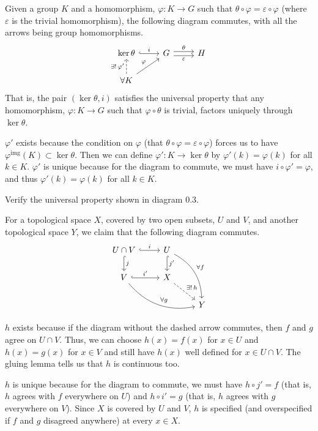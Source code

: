 \documentclass[letterpaper, 12pt]{hmcpset}
\begin{document}
\begin{solution}
	Given a group $K$ and a homomorphism, $\varphi : K \to G$ such that ${\theta \circ \varphi = \varepsilon \circ \varphi}$ (where $\varepsilon$ is the trivial homomorphism), the following diagram commutes, with all the arrows being group homomorphisms.
	\[
		\begin{tikzcd}
			\ker \theta \arrow[r, hook, "i"]
				& G \arrow[r, "\theta", shift left] \arrow[r, "\varepsilon"', shift right]
				& H \\
			\forall K  \arrow[u, dashrightarrow, "\exists ! \, \varphi'"] \arrow[ur, "\varphi"]
		\end{tikzcd}
	\]
	That is, the pair $(\ker \theta, i)$ satisfies the universal property that any homomorphism, $\varphi : K \to G$ such that $\varphi \circ \theta$ is trivial, factors uniquely through $\ker \theta$.

	$\varphi'$ exists because the condition on $\varphi$ (that $\theta \circ \varphi = \varepsilon \circ \varphi$) forces us to have $\varphi^\text{img}(K) \subset \ker \theta$. Then we can define $\varphi' : K \to \ker \theta$ by $\varphi'(k) = \varphi(k)$ for all $k \in K$. $\varphi'$ is unique because for the diagram to commute, we must have $i \circ \varphi' = \varphi$, and thus $\varphi'(k) = \varphi(k)$ for all $k \in K$.
\end{solution}

\pagebreak

\begin{problem}[0.12]
	Verify the universal property shown in diagram 0.3.
\end{problem}

\begin{solution}
	For a topological space $X$, covered by two open subsets, $U$ and $V$, and another topological space $Y$, we claim that the following diagram commutes.
	\[
		\begin{tikzcd}
			U \cap V \arrow[r, hook, "i"] \arrow[d, hook, "j"] & U \arrow[d, hook, "j'"] \arrow[ddr, bend left, "\forall f"] \\
			V \arrow[r, hook, "i'"] \arrow[drr, bend right, "\forall g"] & X \arrow[dr, dashrightarrow, "\exists ! \, h"] \\
						&& Y
		\end{tikzcd}
	\]

	$h$ exists because if the diagram without the dashed arrow commutes, then $f$ and $g$ agree on $U \cap V$. Thus, we can choose $h(x) = f(x)$ for $x \in U$ and $h(x) = g(x)$ for $x \in V$ and still have $h(x)$ well defined for $x \in U \cap V$. The gluing lemma tells us that $h$ is continuous too. 

	$h$ is unique because for the diagram to commute, we must have $h \circ j' = f$ (that is, $h$ agrees with $f$ everywhere on $U$) and $h \circ i' = g$ (that is, $h$ agrees with $g$ everywhere on $V$). Since $X$ is covered by $U$ and $V$, $h$ is specified (and overspecified if $f$ and $g$ disagreed anywhere) at every $x \in X$.
\end{solution}
\end{document}
